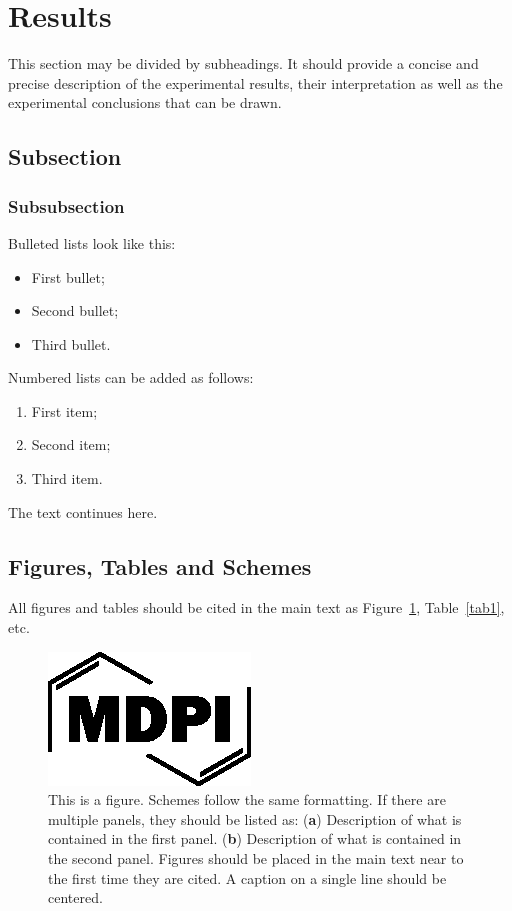 \documentclass[entropy,article,submit,pdftex,moreauthors]{Definitions/mdpi}
\begin{document}
\section{Results}

This section may be divided by subheadings. It should provide a concise and precise description of the experimental results, their interpretation as well as the experimental conclusions that can be drawn.
\subsection{Subsection}
\subsubsection{Subsubsection}

Bulleted lists look like this:
\begin{itemize}
\item	First bullet;
\item	Second bullet;
\item	Third bullet.
\end{itemize}

Numbered lists can be added as follows:
\begin{enumerate}
\item	First item; 
\item	Second item;
\item	Third item.
\end{enumerate}

The text continues here. 

\subsection{Figures, Tables and Schemes}

All figures and tables should be cited in the main text as Figure~\ref{fig1}, Table~\ref{tab1}, etc.

\begin{figure}[H]
\includegraphics[width=10.5 cm]{Definitions/logo-mdpi}
\caption{This is a figure. Schemes follow the same formatting. If there are multiple panels, they should be listed as: (\textbf{a}) Description of what is contained in the first panel. (\textbf{b}) Description of what is contained in the second panel. Figures should be placed in the main text near to the first time they are cited. A caption on a single line should be centered.\label{fig1}}
\end{figure}   
\unskip
\end{document}
